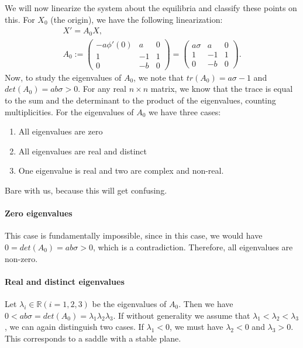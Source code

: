 \message{ !name(chua_circuit.tex)}\documentclass[twocolumn,10pt]{article}
\begin{document}
We will now linearize the system about the equilibria and classify
these points on this.  For $X_0$ (the origin), we have the following
linearization:
\begin{gather}
  \label{eq:linear-origin}
  X' = A_0 X, \\
  A_0 :=
  \begin{pmatrix}
    -a \phi'(0) & a & 0\\
    1 & -1 & 1\\
    0 & -b & 0
  \end{pmatrix}
  =
  \begin{pmatrix}
    a \sigma & a & 0\\
    1 & -1 & 1\\
    0 & -b & 0
  \end{pmatrix}.
\end{gather}
Now, to study the eigenvalues of $A_0$, we note that $tr(A_0) = a \sigma
- 1$ and $det(A_0) = a b \sigma > 0$.  For any real $n \times n$ matrix,
we know that the trace is equal to the sum and the
determinant to the product of the eigenvalues, counting
multiplicities.  For the eigenvalues of $A_0$ we have three cases:
\begin{enumerate}
\item All eigenvalues are zero
\item All eigenvalues are real and distinct
\item One eigenvalue is real and two are complex and non-real.
\end{enumerate}

Bare with us, because this will get confusing.

\paragraph{Zero eigenvalues}
This case is fundamentally impossible, since in this case, we would
have $0 = det(A_0) = ab\sigma > 0$, which is a contradiction.
Therefore, all eigenvalues are non-zero.

\paragraph{Real and distinct eigenvalues}
Let $\lambda_i \in \mathbb{R} (i=1,2,3)$ be the eigenvalues of $A_0$.
Then we have $0 < ab\sigma = det(A_0) = \lambda_1\lambda_2\lambda_3$.
If without generality we assume that $\lambda_1 < \lambda_2 <
\lambda_3$, we can again distinguish two cases.  If $\lambda_1 < 0$,
we must have $\lambda_2 < 0$ and $\lambda_3 > 0$.  This corresponds to
a saddle with a stable plane.
\end{document}
